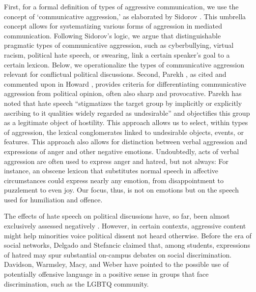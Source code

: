 First, for a formal definition of types of aggressive communication, we use the concept of ‘communicative aggression,’ as elaborated by Sidorov \cite{Sidorov}. This umbrella concept allows for systematizing various forms of aggression in mediated communication. Following Sidorov’s logic, we argue that distinguishable pragmatic types of communicative aggression, such as cyberbullying, virtual racism, political hate speech, or swearing, link a certain speaker’s goal to a certain lexicon. Below, we operationalize the types of communicative aggression relevant for conflictual political discussions. Second, Parekh \cite{Parekh}, as cited and commented upon in Howard \cite{Howard}, provides criteria for differentiating communicative aggression from political opinion, often also sharp and provocative. Parekh \cite[p.~41]{Parekh} has noted that hate speech “stigmatizes the target group by implicitly or explicitly ascribing to it qualities widely regarded as undesirable” and objectifies this group as a legitimate object of hostility. This approach allows us to select, within types of aggression, the lexical conglomerates linked to undesirable objects, events, or features. This approach also allows for distinction between verbal aggression and expressions of anger and other negative emotions. Undoubtedly, acts of verbal aggression are often used to express anger and hatred, but not always: For instance, an obscene lexicon that substitutes normal speech in affective circumstances could express nearly any emotion, from disappointment to puzzlement to even joy. Our focus, thus, is not on emotions but on the speech used for humiliation and offence.

The effects of hate speech on political discussions have, so far, been almost exclusively assessed negatively \cite{VanAkenRischKrestel}. However, in certain contexts, aggressive content might help minorities voice political dissent not heard otherwise. Before the era of social networks, Delgado and Stefancic \cite{DelgadoStefancic} claimed that, among students, expressions of hatred may spur substantial on-campus debates on social discrimination. Davidson, Warmsley, Macy, and Weber \cite{DavidsonWarmsleyMacy} have pointed to the possible use of potentially offensive language in a positive sense in groups that face discrimination, such as the LGBTQ community.

